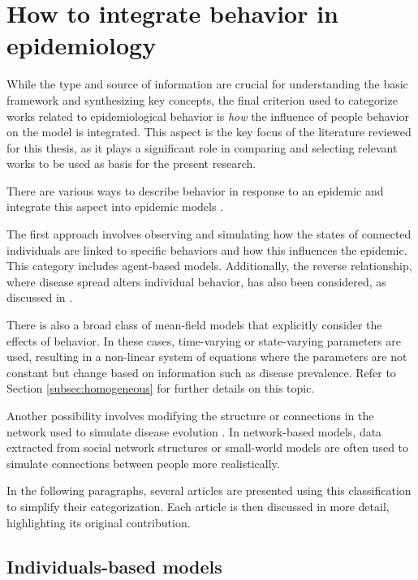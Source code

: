 \section{How to integrate behavior in epidemiology}
While the type and source of information are crucial for understanding the basic framework and synthesizing key concepts, the final criterion used to categorize works related to epidemiological behavior is \textit{how} the influence of people behavior on the model is integrated. This aspect is the key focus of the literature reviewed for this thesis, as it plays a significant role in comparing and selecting relevant works to be used as basis for the present research.

There are various ways to describe behavior in response to an epidemic and integrate this aspect into epidemic models \cite{Wang_2019, Bedson2021, Wang_2015_review}.

The first approach involves observing and simulating how the states of connected individuals are linked to specific behaviors and how this influences the epidemic. This category includes agent-based models. Additionally, the reverse relationship, where disease spread alters individual behavior, has also been considered, as discussed in \cite{Granell_2014}.

There is also a broad class of mean-field models that explicitly consider the effects of behavior. In these cases, time-varying or state-varying parameters are used, resulting in a non-linear system of equations where the parameters are not constant but change based on information such as disease prevalence. Refer to Section \ref{subsec:homogeneous} for further details on this topic.

Another possibility involves modifying the structure or connections in the network used to simulate disease evolution \cite{Peng2021}. In network-based models, data extracted from social network structures \cite{Carballosa_2021} or small-world models \cite{Turker_2023} are often used to simulate connections between people more realistically.

In the following paragraphs, several articles are presented using this classification to simplify their categorization. Each article is then discussed in more detail, highlighting its original contribution.

\subsection{Individuals-based models}
\label{subsec:individual_state}
